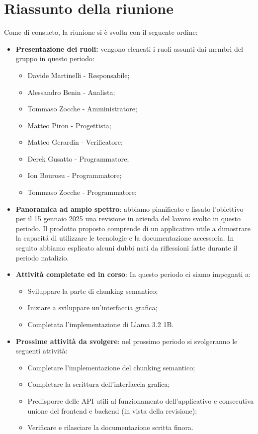 \section{Riassunto della riunione}
Come di consueto, la riunione si  è svolta con il seguente ordine:
\begin{itemize}
    \item \textbf{Presentazione dei ruoli:} vengono elencati i ruoli assunti dai membri del gruppo
in questo periodo:
    \begin{itemize}
        \item Davide Martinelli - Responsabile;
        \item Alessandro Benin - Analista;
        \item Tommaso Zocche - Amministratore;
        \item Matteo Piron - Progettista;
        \item Matteo Gerardin - Verificatore;
        \item Derek Gusatto - Programmatore;
        \item Ion Bourosu - Programmatore;
        \item Tommaso Zocche - Programmatore;
    \end{itemize}

    \item \textbf{Panoramica ad ampio spettro}: abbiamo pianificato e fissato l'obiettivo per il 15 gennaio 2025 una revisione in azienda del lavoro svolto in questo periodo. Il prodotto proposto comprende di un applicativo utile a dimostrare la capacitá di utilizzare le tecnologie e la documentazione accessoria. In seguito abbiamo esplicato alcuni dubbi nati da riflessioni fatte durante il periodo natalizio.

     \item \textbf{Attività completate ed in corso}: In questo periodo ci siamo impegnati a:
     \begin{itemize}
         \item Sviluppare la parte di chunking semantico;
         \item Iniziare a sviluppare un'interfaccia grafica;
         \item Completata l'implementazione di Llama 3.2 1B.
     \end{itemize}

     \item \textbf{Prossime attività da svolgere}: nel prossimo periodo si svolgeranno le seguenti attività:
     \begin{itemize}
         \item Completare l'implementazione del chunking semantico;
         \item Completare la scrittura dell'interfaccia grafica;
         \item Predisporre delle API utili al funzionamento dell'applicativo e consecutiva unione del frontend e backend (in vista della revisione);
         \item Verificare e rilasciare la documentazione scritta finora.
     \end{itemize}


\end{itemize}
